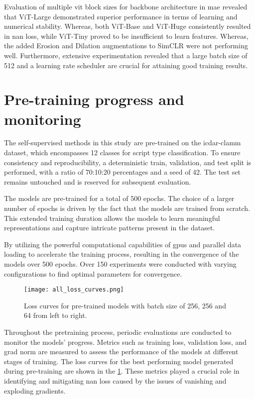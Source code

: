Evaluation of multiple \gls{vit} block sizes for backbone architecture in \gls{mae} revealed that ViT-Large demonstrated superior performance in terms of learning and numerical stability. Whereas, both ViT-Base and ViT-Huge consistently resulted in \gls{nan} loss, while ViT-Tiny proved to be insufficient to learn features. Whereas, the added Erosion and Dilation augmentations to SimCLR were not performing well. Furthermore, extensive experimentation revealed that a large batch size of 512 and a learning rate scheduler are crucial for attaining good training results.

\section{Pre-training progress and monitoring}

The self-supervised methods in this study are pre-trained on the \gls{icdar}-\gls{clamm} dataset, which encompasses 12 classes for script type classification. To ensure consistency and reproducibility, a deterministic train, validation, and test split is performed, with a ratio of 70:10:20 percentages and a seed of 42. The test set remains untouched and is reserved for subsequent evaluation.

The models are pre-trained for a total of 500 epochs. The choice of a larger number of epochs is driven by the fact that the models are trained from scratch. This extended training duration allows the models to learn meaningful representations and capture intricate patterns present in the dataset.

By utilizing the powerful computational capabilities of \glspl{gpu} and parallel data loading to accelerate the training process, resulting in the convergence of the models over 500 epochs. Over 150 experiments were conducted with varying configurations to find optimal parameters for convergence.

\begin{figure}[ht]
	\texttt{[image: all\_loss\_curves.png]}
	\centering
	\caption[Pre-training loss curves]{Loss curves for pre-trained models with batch size of 256, 256 and 64 from left to right.}
	\label{fig:loss}
\end{figure}

Throughout the pretraining process, periodic evaluations are conducted to monitor the models’ progress. Metrics such as training loss, validation loss, and grad norm are measured to assess the performance of the models at different stages of training. The loss curves for the best performing model generated during pre-training are shown in the \cref{fig:loss}. These metrics played a crucial role in identifying and mitigating \gls{nan} loss caused by the issues of vanishing and exploding gradients.

